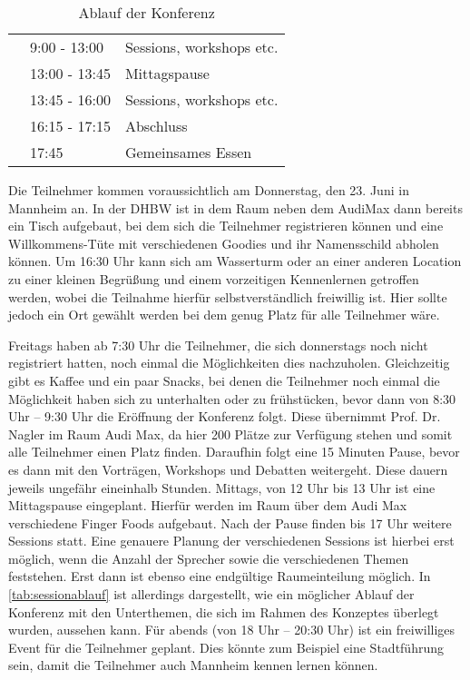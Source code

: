 \begin{table}[h]
\begin{tabular}{|l|l|l|}
			& 9:00 - 13:00  & Sessions, workshops etc.                                                                              \\ \cline{2-3} 
			& 13:00 - 13:45 & Mittagspause                                                                                          \\ \cline{2-3} 
			& 13:45 - 16:00 & Sessions, workshops etc.                                                                              \\ \cline{2-3} 
			& 16:15 - 17:15 & Abschluss                                                                                             \\ \cline{2-3} 
			& 17:45         & Gemeinsames Essen                                                                                     \\ \hline
		\end{tabular}%
	\caption{Ablauf der Konferenz}
	\label{tab:konferenzablauf}
\end{table}
Die Teilnehmer kommen voraussichtlich am Donnerstag, den 23. Juni in Mannheim an. In der DHBW ist in dem Raum neben dem AudiMax dann bereits ein Tisch aufgebaut, bei dem sich die Teilnehmer registrieren können und eine Willkommens-Tüte mit verschiedenen Goodies und ihr Namensschild abholen können. Um 16:30 Uhr kann sich am Wasserturm oder an einer anderen Location zu einer kleinen Begrüßung und einem vorzeitigen Kennenlernen getroffen werden, wobei die Teilnahme hierfür selbstverständlich freiwillig ist. Hier sollte jedoch ein Ort gewählt werden bei dem genug Platz für alle Teilnehmer wäre.

Freitags haben ab 7:30 Uhr die Teilnehmer, die sich donnerstags noch nicht registriert hatten, noch einmal die Möglichkeiten dies nachzuholen. Gleichzeitig gibt es Kaffee und ein paar Snacks, bei denen die Teilnehmer noch einmal die Möglichkeit haben sich zu unterhalten oder zu frühstücken, bevor dann von 8:30 Uhr – 9:30 Uhr die Eröffnung der Konferenz folgt. Diese übernimmt Prof. Dr. Nagler im Raum Audi Max, da hier 200 Plätze zur Verfügung stehen und somit alle Teilnehmer einen Platz finden. Daraufhin folgt eine 15 Minuten Pause, bevor es dann mit den Vorträgen, Workshops und Debatten weitergeht. Diese dauern jeweils ungefähr eineinhalb Stunden. Mittags, von 12 Uhr bis 13 Uhr ist eine Mittagspause eingeplant. Hierfür werden im Raum über dem Audi Max verschiedene Finger Foods aufgebaut. Nach der Pause finden bis 17 Uhr weitere Sessions statt. Eine genauere Planung der verschiedenen Sessions ist hierbei erst möglich, wenn die Anzahl der Sprecher sowie die verschiedenen Themen feststehen. Erst dann ist ebenso eine endgültige Raumeinteilung möglich. In \autoref{tab:sessionablauf}
ist allerdings dargestellt, wie ein möglicher Ablauf der Konferenz mit den Unterthemen, die sich im Rahmen des Konzeptes überlegt wurden, aussehen kann. Für abends (von 18 Uhr – 20:30 Uhr) ist ein freiwilliges Event für die Teilnehmer geplant. Dies könnte zum Beispiel eine Stadtführung sein, damit die Teilnehmer auch Mannheim kennen lernen können.
 
